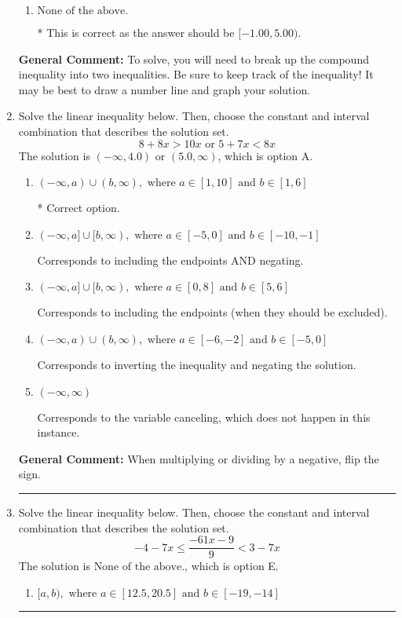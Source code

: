 \documentclass{extbook}[14pt]
\newcommand{\litem}[1]{\item #1

\rule{\textwidth}{0.4pt}}
\begin{document}
\begin{enumerate}
{\begin{enumerate}[label=\Alph*.]
$(-\infty, 1.00) \cup [-5.00, \infty)$, which corresponds to displaying the and-inequality as an or-inequality AND flipping the inequality AND getting negatives of the actual endpoints.
\item \( \text{None of the above.} \)

* This is correct as the answer should be $[-1.00, 5.00)$.
\end{enumerate}

\textbf{General Comment:} To solve, you will need to break up the compound inequality into two inequalities. Be sure to keep track of the inequality! It may be best to draw a number line and graph your solution.
}
\litem{
Solve the linear inequality below. Then, choose the constant and interval combination that describes the solution set.
\[ 8 + 8 x > 10 x \text{ or } 5 + 7 x < 8 x \]
The solution is \( (-\infty, 4.0) \text{ or } (5.0, \infty) \), which is option A.\begin{enumerate}[label=\Alph*.]
\item \( (-\infty, a) \cup (b, \infty), \text{ where } a \in [1, 10] \text{ and } b \in [1, 6] \)

 * Correct option.
\item \( (-\infty, a] \cup [b, \infty), \text{ where } a \in [-5, 0] \text{ and } b \in [-10, -1] \)

Corresponds to including the endpoints AND negating.
\item \( (-\infty, a] \cup [b, \infty), \text{ where } a \in [0, 8] \text{ and } b \in [5, 6] \)

Corresponds to including the endpoints (when they should be excluded).
\item \( (-\infty, a) \cup (b, \infty), \text{ where } a \in [-6, -2] \text{ and } b \in [-5, 0] \)

Corresponds to inverting the inequality and negating the solution.
\item \( (-\infty, \infty) \)

Corresponds to the variable canceling, which does not happen in this instance.
\end{enumerate}

\textbf{General Comment:} When multiplying or dividing by a negative, flip the sign.
}
\litem{
Solve the linear inequality below. Then, choose the constant and interval combination that describes the solution set.
\[ -4 - 7 x \leq \frac{-61 x - 9}{9} < 3 - 7 x \]
The solution is \( \text{None of the above.} \), which is option E.\begin{enumerate}[label=\Alph*.]
\item \( [a, b), \text{ where } a \in [12.5, 20.5] \text{ and } b \in [-19, -14] \)


\end{enumerate}}
\end{enumerate}
\end{document}
